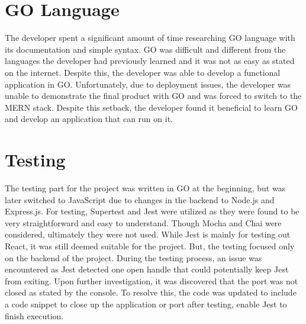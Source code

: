 \section{GO Language}
The developer spent a significant amount of time researching GO language with its documentation and simple syntax. GO was difficult and different from the languages the developer had previously learned and it was not as easy as stated on the internet. Despite this, the developer was able to develop a functional application in GO. Unfortunately, due to deployment issues, the developer was unable to demonstrate the final product with GO and was forced to switch to the MERN stack. Despite this setback, the developer found it beneficial to learn GO and develop an application that can run on it.

\section{Testing}
The testing part for the project was written in GO at the beginning, but was later switched to JavaScript due to changes in the backend to Node.js and Express.js. For testing, Supertest and Jest were utilized as they were found to be very straightforward and easy to understand. Though Mocha and Chai were considered, ultimately they were not used. While Jest is mainly for testing out React, it was still deemed suitable for the project. But, the testing focused only on the backend of the project. During the testing process, an issue was encountered as Jest detected one open handle that could potentially keep Jest from exiting. Upon further investigation, it was discovered that the port was not closed as stated by the console. To resolve this, the code was updated to include a code snippet to close up the application or port after testing, enable Jest to finish execution.
